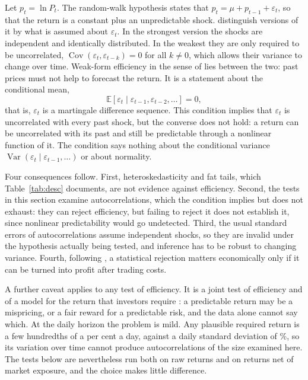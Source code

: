 \documentclass[11pt,a4paper]{article}
\newcommand{\E}{\mathbb{E}}
\newcommand{\Var}{\operatorname{Var}}
\newcommand{\Cov}{\operatorname{Cov}}
\begin{document}
Let $p_t=\ln P_t$. The random-walk hypothesis states that $p_t=\mu+p_{t-1}+\varepsilon_t$, so that the return is a constant plus an unpredictable shock. \citet{clm1997} distinguish versions of it by what is assumed about $\varepsilon_t$. In the strongest version the shocks are independent and identically distributed. In the weakest they are only required to be uncorrelated, $\Cov(\varepsilon_t,\varepsilon_{t-k})=0$ for all $k\neq 0$, which allows their variance to change over time. Weak-form efficiency in the sense of \citet{fama1970} lies between the two: past prices must not help to forecast the return. It is a statement about the conditional mean,
\begin{equation}
\E\!\left[\varepsilon_t \mid \varepsilon_{t-1},\varepsilon_{t-2},\dots\right]=0 ,
\end{equation}
that is, $\varepsilon_t$ is a martingale difference sequence. This condition implies that $\varepsilon_t$ is uncorrelated with every past shock, but the converse does not hold: a return can be uncorrelated with its past and still be predictable through a nonlinear function of it. The condition says nothing about the conditional variance $\Var(\varepsilon_t\mid\varepsilon_{t-1},\dots)$ or about normality.

Four consequences follow. First, heteroskedasticity and fat tails, which Table~\ref{tab:desc} documents, are not evidence against efficiency. Second, the tests in this section examine autocorrelations, which the condition implies but does not exhaust: they can reject efficiency, but failing to reject it does not establish it, since nonlinear predictability would go undetected. Third, the usual standard errors of autocorrelations assume independent shocks, so they are invalid under the hypothesis actually being tested, and inference has to be robust to changing variance. Fourth, following \citet{jensen1978}, a statistical rejection matters economically only if it can be turned into profit after trading costs.

A further caveat applies to any test of efficiency. It is a joint test of efficiency and of a model for the return that investors require \citep{fama1970,fama1991}: a predictable return may be a mispricing, or a fair reward for a predictable risk, and the data alone cannot say which. At the daily horizon the problem is mild. Any plausible required return is a few hundredths of a per cent a day, against a daily standard deviation of \aruSD\%, so its variation over time cannot produce autocorrelations of the size examined here. The tests below are nevertheless run both on raw returns and on returns net of market exposure, and the choice makes little difference.
\end{document}

